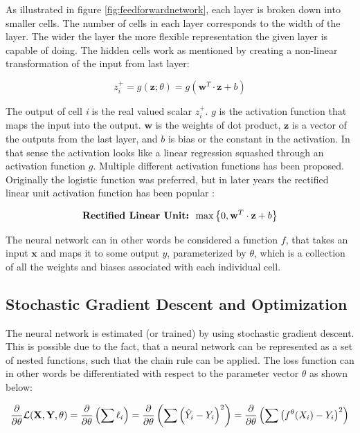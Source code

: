 As illustrated in figure \ref{fig:feedforwardnetwork}, each layer is broken down into smaller cells. The number of cells in each layer corresponds to the width of the layer. The wider the layer the more flexible representation the given layer is capable of doing. The hidden cells work as mentioned by creating a non-linear transformation of the input from last layer:

\begin{equation}
    z_i^{+} = g(\textbf{z}; \theta) = g(\textbf{w}^T \cdot \textbf{z} + b)
\end{equation}

The output of cell \textit{i} is the real valued scalar $z_i^+$. $g$ is the activation function that maps the input into the output. $\textbf{w}$ is the weights of dot product, $\textbf{z}$ is a vector of the outputs from the last layer, and $b$ is bias or the constant in the activation. In that sense the activation looks like a linear regression squashed through an activation function $g$. Multiple different activation functions has been proposed. Originally the logistic function was preferred, but in later years the rectified linear unit activation function has been popular \parencite{goodfellow_deep_2016}:

\begin{equation}
    \textbf{Rectified Linear Unit: }  \max \left\{ 0, \textbf{w}^T \cdot \textbf{z} + b \right\}
\end{equation}

The neural network can in other words be considered a function $f$, that takes an input $\textbf{x}$ and maps it to some output $y$, parameterized by $\theta$, which is a collection of all the weights and biases associated with each individual cell.

\subsection{Stochastic Gradient Descent and Optimization}

The neural network is estimated (or trained) by using stochastic gradient descent. This is possible due to the fact, that a neural network can be represented as a set of nested functions, such that the chain rule can be applied. The loss function can in other words be differentiated with respect to the parameter vector $\theta$ as shown below:

\begin{equation}\label{eq:loss_function}
    \frac{\partial}{\partial\theta} \mathcal{L} (\textbf{X}, \textbf{Y}, \theta) = \frac{\partial}{\partial\theta} \left( \sum \ell_i \right) = \frac{\partial}{\partial\theta} \left( \sum \left( \hat{Y}_i  - Y_i \right)^2 \right) = \frac{\partial}{\partial\theta} \left( \sum \left( f^{\theta}(X_i)  - Y_i \right)^2 \right)
\end{equation}

